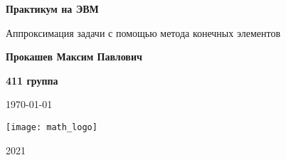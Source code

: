 \begin{titlepage}
	\begin{center}
		\Huge
		\textbf{Практикум на ЭВМ}
		\vspace{0.5cm}
		
		\Large
		Аппроксимация задачи с помощью метода конечных элементов
		\vspace{1.5cm}
		
		\LARGE
		\textbf{Прокашев Максим Павлович}
		
		\vspace{0.5cm}
		\textbf{411 группа}
		
		\vspace{0.5cm}
		\today
		
		\vfill
		\texttt{[image: math\_logo]}
		\vspace{0.5cm}
		
		\Large
		2021
	\end{center}
\end{titlepage}